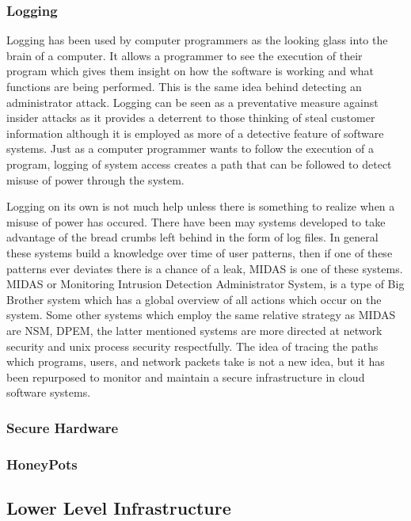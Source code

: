 \subsubsection{Logging}
\label{hlLogging}

Logging has been used by computer programmers as the looking glass into the brain of a computer. It allows a programmer to see the execution of their program which gives them insight on how the software is working and what functions are being performed. This is the same idea behind detecting an administrator attack. Logging can be seen as a preventative measure against insider attacks as it provides a deterrent to those thinking of steal customer information although it is employed as more of a detective feature of software systems. Just as a computer programmer wants to follow the execution of a program, logging of system access creates a path that can be followed to detect misuse of power through the system.

Logging on its own is not much help unless there is something to realize when a misuse of power has occured. There have been may systems developed to take advantage of the bread crumbs left behind in the form of log files. In general these systems build a knowledge over time of user patterns, then if one of these patterns ever deviates there is a chance of a leak, MIDAS is one of these systems. MIDAS or Monitoring Intrusion Detection Administrator System, is a type of Big Brother system which has a global overview of all actions which occur on the system. Some other systems which employ the same relative strategy as MIDAS are NSM, DPEM, the latter mentioned systems are more directed at network security and unix process security respectfully. The idea of tracing the paths which programs, users, and network packets take is not a new idea, but it has been repurposed to monitor and maintain a secure infrastructure in cloud software systems.

\subsubsection{Secure Hardware}
\label{hlSecureHW}

\subsubsection{HoneyPots}
\label{hlHoneyPots}

\subsection{Lower Level Infrastructure}
\label{llInfrastructure}

